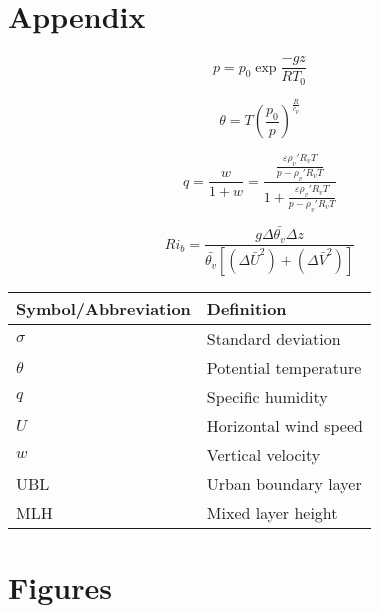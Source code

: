 \documentclass[num-refs]{wiley-article}
\begin{document}
\printbibliography

\section*{Appendix}

\begin{equation*}\label{eqn:pressure}
	p = p_0 \exp{\frac{-g z}{R T_0}}
\end{equation*}

\begin{equation*}\label{eqn:potential_temperature}
	\theta = T \left(\frac{p_0}{p} \right)^{\frac{R}{c_p}}
\end{equation*}

\begin{equation*}\label{eqn:specific_humidity}
	q = \frac{w}{1+w} = \frac{\frac{\varepsilon \rho_v' R_v T}{p - \rho_v' R_v T}}{1+\frac{\varepsilon \rho_v' R_v T}{p - \rho_v' R_v T}} 
\end{equation*}

\begin{equation*}
	Ri_b = \frac{g \Delta \bar{\theta_v} \Delta z}{\bar{\theta_v} \left[ (\Delta \bar{U}^2) + (\Delta \bar{V}^2) \right] }
\end{equation*}

\label{tab:symbols}
\begin{center}
	\begin{tabularx}{0.5\textwidth}{l X}
 		\hline
 		Symbol/Abbreviation & Definition \\
 		\hline
 		$\sigma$ & Standard deviation \\
 		$\theta$ & Potential temperature \\
 		$q$ & Specific humidity \\
 		$U$ & Horizontal wind speed \\
 		$w$ & Vertical velocity \\
 		UBL & Urban boundary layer \\
 		MLH & Mixed layer height \\
 		\hline
	\end{tabularx}
\end{center}



\section*{Figures}
\end{document}
